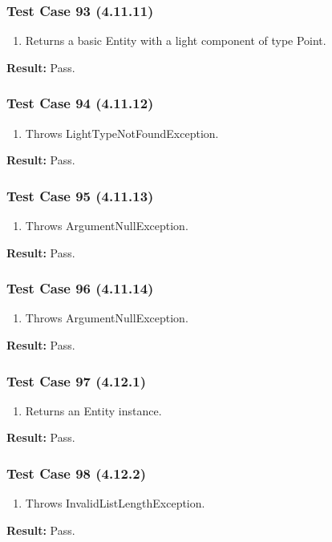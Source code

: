 \documentclass[a4paper,12pt]{article}
\begin{document}
		\subsubsection{Test Case 93 (4.11.11)}
				\begin{enumerate}
					\item Returns a basic Entity with a light component of type Point.
				\end{enumerate}
			\textbf{Result: }Pass.
		\subsubsection{Test Case 94 (4.11.12)}
				\begin{enumerate}
					\item Throws LightTypeNotFoundException.
				\end{enumerate}
			\textbf{Result: }Pass.
		\subsubsection{Test Case 95 (4.11.13)}
				\begin{enumerate}
					\item Throws ArgumentNullException.
				\end{enumerate}
			\textbf{Result: }Pass.
		\subsubsection{Test Case 96 (4.11.14)}
				\begin{enumerate}
					\item Throws ArgumentNullException.
				\end{enumerate}
			\textbf{Result: }Pass.
		\subsubsection{Test Case 97 (4.12.1)}
				\begin{enumerate}
					\item Returns an Entity instance.
				\end{enumerate}
			\textbf{Result: }Pass.
		\subsubsection{Test Case 98 (4.12.2)}
				\begin{enumerate}
					\item Throws InvalidListLengthException.
				\end{enumerate}
			\textbf{Result: }Pass.
\end{document}
